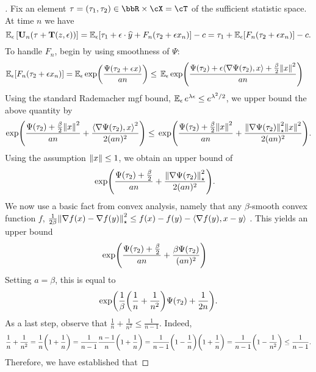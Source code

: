 \begin{proof}[]
  Fix an element $\tau=(\tau_1, \tau_2)\in\bbR\times{}\cX=\cT$ of the sufficient statistic space. At time $n$ we have
  \[
    \En_{\eps}\left[\burk_{n}(\tau + \suff(z,\eps))\right] = \En_{\eps}\brk*{\tau_{1} +  \eps\cdot\pred + F_{n}(\tau_{2} + \eps{}x_n)} - c = \tau_{1} + \En_{\eps}\brk*{F_{n}(\tau_{2} + \eps{}x_n)} - c.
  \]
  To handle $F_n$, begin by using smoothness of $\Psi$:
  \begin{align*}
\En_{\eps}\brk*{F_{n}(\tau_{2} + \eps{}x_n)} =  \En_{\eps}\exp\prn*{\frac{\Psi(\tau_{2} + \eps{}x)}{an}} &\leq{}
                                                               \En_{\eps}\exp\prn*{\frac{\Psi(\tau_{2}) + \eps\tri*{\grad\Psi(\tau_2), x} + \frac{\beta}{2}\nrm*{x}^{2}}{an}} 
\end{align*}
Using the standard Rademacher mgf bound, $\En_{\eps}e^{\lambda{}\eps}\leq{}e^{\lambda^{2}/2}$, we upper bound the above quantity by
\begin{align*}
\exp\prn*{\frac{\Psi(\tau_{2}) + \frac{\beta}{2}\nrm*{x}^{2}}{an} + \frac{\tri*{\grad\Psi(\tau_2), x}^{2}}{2(an)^{2}}}\leq{}    \exp\prn*{\frac{\Psi(\tau_{2}) + \frac{\beta}{2}\nrm*{x}^{2}}{an} + \frac{\nrm*{\grad\Psi(\tau_2)}_{\star}^{2}\nrm*{x}^{2}}{2(an)^{2}}}.
\end{align*}
Using the assumption $\nrm*{x}\leq{}1$, we obtain an upper bound of
\begin{align*}
&\exp\prn*{\frac{\Psi(\tau_{2}) + \frac{\beta}{2}}{an} + \frac{\nrm*{\grad\Psi(\tau_2)}_{\star}^{2}}{2(an)^{2}}}.
\end{align*}
We now use a basic fact from convex analysis, namely that any $\beta$-smooth convex function $f$, $\frac{1}{2\beta}\nrm*{\grad{}f(x) - \grad{}f(y)}_{\star}^{2} \leq{} f(x) - f(y) - \tri*{\grad{}f(y), x-y}$ . This yields an upper bound
\begin{align*}
&\exp\prn*{\frac{\Psi(\tau_{2}) + \frac{\beta}{2}}{an} + \frac{\beta\Psi(\tau_2)}{(an)^{2}}}
\end{align*}
Setting $a=\beta$, this is equal to
\begin{align*} 
	\exp\prn*{\frac{1}{\beta}\prn*{\frac{1}{n} + \frac{1}{n^2}}\Psi(\tau_2) + \frac{1}{2n}}.
\end{align*}
  As a last step, observe that $\frac{1}{n} + \frac{1}{n^{2}} \leq{} \frac{1}{n-1}$. Indeed,
  \[
    \frac{1}{n} + \frac{1}{n^{2}} = \frac{1}{n}\prn*{1 + \frac{1}{n}} = \frac{1}{n-1}\frac{n-1}{n}\prn*{1+\frac{1}{n}}
    = \frac{1}{n-1}\prn*{1-\frac{1}{n}}\prn*{1+\frac{1}{n}}
    = \frac{1}{n-1}\prn*{1 - \frac{1}{n^{2}}}\leq{} \frac{1}{n-1}.
  \]
  Therefore, we have established that

\end{proof}
